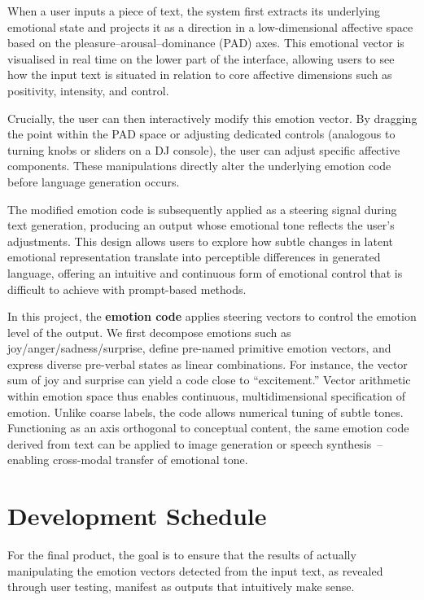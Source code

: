 \documentclass[12pt,twoside]{report}
\begin{document}
\begin{enumerate}
    When a user inputs a piece of text, the system first extracts its underlying emotional state and projects it as a direction in a low-dimensional affective space based on the pleasure–arousal–dominance (PAD) axes. This emotional vector is visualised in real time on the lower part of the interface, allowing users to see how the input text is situated in relation to core affective dimensions such as positivity, intensity, and control.

    Crucially, the user can then interactively modify this emotion vector. By dragging the point within the PAD space or adjusting dedicated controls (analogous to turning knobs or sliders on a DJ console), the user can adjust specific affective components. These manipulations directly alter the underlying emotion code before language generation occurs.

    The modified emotion code is subsequently applied as a steering signal during text generation, producing an output whose emotional tone reflects the user’s adjustments. This design allows users to explore how subtle changes in latent emotional representation translate into perceptible differences in generated language, offering an intuitive and continuous form of emotional control that is difficult to achieve with prompt-based methods.
\end{enumerate}

In this project, the \textbf{emotion code} applies steering vectors to control the emotion level of the output. We first decompose emotions such as joy/anger/sadness/surprise, define pre-named primitive emotion vectors, and express diverse pre-verbal states as linear combinations. For instance, the vector sum of joy and surprise can yield a code close to ``excitement.'' Vector arithmetic within emotion space thus enables continuous, multidimensional specification of emotion. Unlike coarse labels, the code allows numerical tuning of subtle tones. Functioning as an axis orthogonal to conceptual content, the same emotion code derived from text can be applied to image generation or speech synthesis~-- enabling cross-modal transfer of emotional tone.

\section{Development Schedule}

For the final product, the goal is to ensure that the results of actually manipulating the emotion vectors detected from the input text, as revealed through user testing, manifest as outputs that intuitively make sense.
\end{document}
